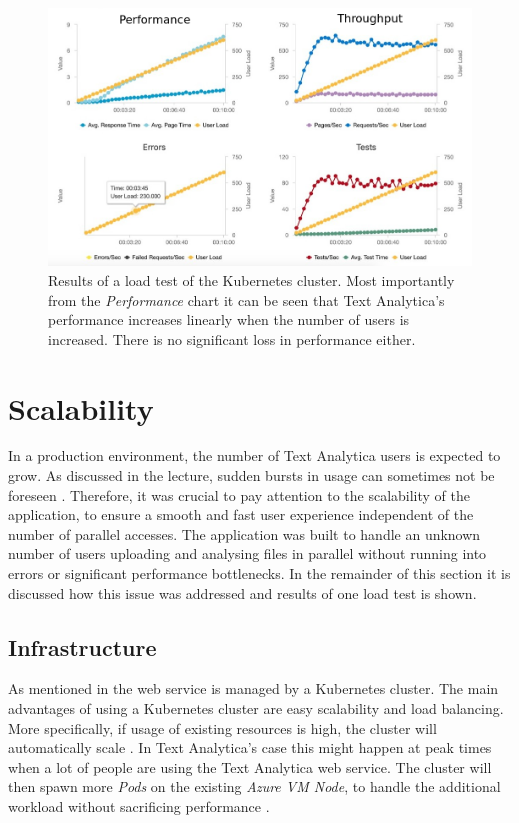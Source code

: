 \documentclass[conference]{IEEEtran}
\begin{document}
\begin{figure}[ht!]
\includegraphics[width=170mm]{img/loadtest_01.png}
\caption{Results of a load test of the Kubernetes cluster. Most importantly from the \textit{Performance} chart it can be seen that Text Analytica's performance increases linearly when the number of users is increased. There is no significant loss in performance either.}
\label{img:loadtesting}
\end{figure}

\section{Scalability}
\label{sec:scalability}
In a production environment, the number of Text Analytica users is expected to grow. As discussed in the lecture, sudden bursts in usage can sometimes not be foreseen \cite{Animoto}. Therefore, it was crucial to pay attention to the scalability of the application, to ensure a smooth and fast user experience independent of the number of parallel accesses. The application was built to handle an unknown number of users uploading and analysing files in parallel without running into errors or significant performance bottlenecks. In the remainder of this section it is discussed how this issue was addressed and results of one load test is shown.

\subsection{Infrastructure}
As mentioned in  the web service is managed by a Kubernetes cluster. The main advantages of using a Kubernetes cluster are easy scalability and load balancing. More specifically, if usage of existing resources is high, the cluster will automatically scale \cite{KubernetesScaling, KubernetesAutoscaler}. In Text Analytica's case this might happen at peak times when a lot of people are using the Text Analytica web service. The cluster will then spawn more \textit{Pods} on the existing \textit{Azure VM Node}, to handle the additional workload without sacrificing performance \cite{MicrosoftAzureKubernetesService}.
\end{document}
